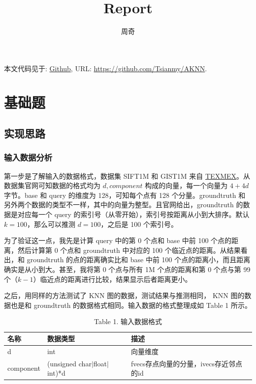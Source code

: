 \documentclass{article}
\title{Report}
\date{}
\author{周奇}
\begin{document}
\maketitle

本文代码见于: \href{https://github.com/Tsianmy/AKNN}{Github}, URL: \url{https://github.com/Tsianmy/AKNN}.

\section{基础题}

\subsection{实现思路}

\subsubsection*{输入数据分析}
第一步是了解输入的数据格式，数据集 SIFT1M 和 GIST1M 来自 \href{http://corpus-texmex.irisa.fr/}{TEXMEX}。从数据集官网可知数据的格式均为 $d, component$ 构成的向量，每一个向量为 $4 + 4d$ 字节。base 和 query 的维度为 128，可知每个点有 128 个分量。groundtruth 和另外两个数据的类型不一样，其中的向量为整型。且官网给出，groundtruth 的数据是对应每一个 query 的索引号（从零开始），索引号按距离从小到大排序。默认 $k = 100$，那么可以推测 $d = 100$，之后是 100 个索引号。

为了验证这一点，我先是计算 query 中的第 0 个点和 base 中前 100 个点的距离，然后计算第 0 个点和 groundtruth 中对应的 100 个临近点的距离。从结果看出，和 groundtruth 的点的距离确实比和 base 中前 100 个点的距离小，而且距离确实是从小到大。甚至，我将第 0 个点与所有 1M 个点的距离和第 0 个点与第 99 个（$k - 1$）临近点的距离进行比较，结果显示后者距离更小。

之后，用同样的方法测试了 KNN 图的数据，测试结果与推测相同， KNN 图的数据也是和 groundtruth 的数据格式相同。输入数据的格式整理成如 Table 1 所示。

\begin{table}[h]
\caption*{Table 1. 输入数据格式}
\centering
\small
\begin{tabular}{@{}lll@{}}
	\toprule
	名称        & 数据类型                            & 描述                             \\ \midrule
	d         & int                             & 向量维度                           \\
	component & (unsigned char$|$float$|$int)*d & fvecs存点向量的分量，ivecs存近邻点的id \\ \bottomrule
\end{tabular}
\end{table}
\end{document}
